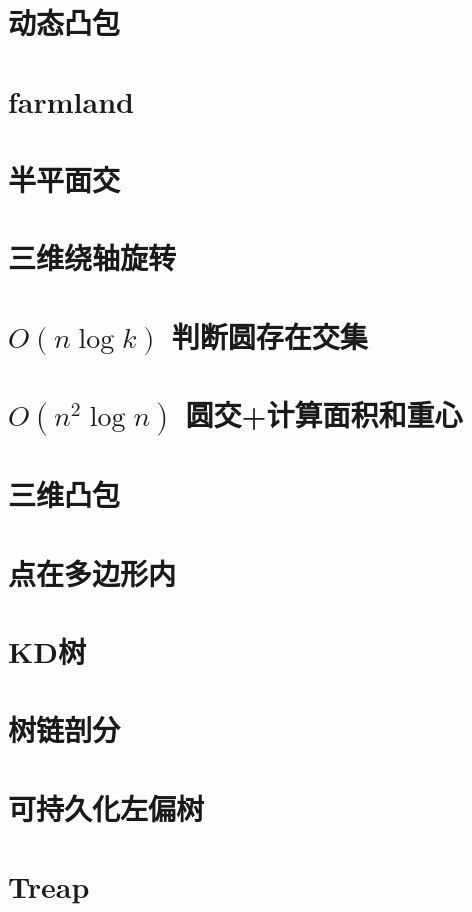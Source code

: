 \documentclass[landscape, twocolumn, 8pt, a4paper, twoside]{extarticle}
\begin{document}
\section{动态凸包}
	
\section{farmland}
	
\section{半平面交}
	
\section{三维绕轴旋转}
	
\section{$O(n\log k)$ 判断圆存在交集}
	
\section{$O(n^2\log n)$ 圆交+计算面积和重心}
	
\section{三维凸包}
	
\section{点在多边形内}
	

\section{KD树}
	
\section{树链剖分}
	
\section{可持久化左偏树}
	
\section{Treap}
	
\end{document}
